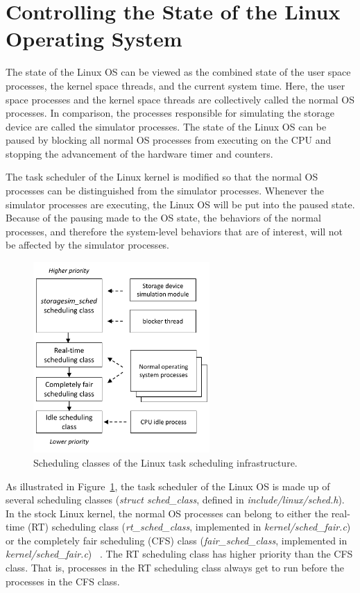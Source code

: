 \section{Controlling the State of the Linux Operating System}
\label{sec:managing-linux-OS-state}

The state of the Linux OS can be viewed as the combined state of the user space processes, the kernel space threads, and the current system time. Here, the user space processes and the kernel space threads are collectively called the normal OS processes. In comparison, the processes responsible for simulating the storage device are called the simulator processes. The state of the Linux OS can be paused by blocking all normal OS processes from executing on the CPU and stopping the advancement of the hardware timer and counters.

The task scheduler of the Linux kernel is modified so that the normal OS processes can be distinguished from the simulator processes. Whenever the simulator processes are executing, the Linux OS will be put into the paused state. Because of the pausing made to the OS state, the behaviors of the normal processes, and therefore the system-level behaviors that are of interest, will not be affected by the simulator processes.

\begin{figure}[htpb!]
	\centering
	\includegraphics[width=0.6\textwidth]{figures/ch5-scheduling-classes.pdf}
	\caption{\label{fig:ch5-scheduling-classes}Scheduling classes of the Linux task scheduling infrastructure.}
\end{figure}

As illustrated in Figure~\ref{fig:ch5-scheduling-classes}, the task scheduler of the Linux OS is made up of several scheduling classes (\textit{struct sched_class}, defined in \textit{include/linux/sched.h}). In the stock Linux kernel, the normal OS processes can belong to either the real-time (RT) scheduling class (\textit{rt_sched_class}, implemented in \textit{kernel/sched_fair.c}) or the completely fair scheduling (CFS) class (\textit{fair_sched_class}, implemented in \textit{kernel/sched_fair.c})~\cite{Bovet:2005} \cite{Love:2010}. The RT scheduling class has higher priority than the CFS class. That is, processes in the RT scheduling class always get to run before the processes in the CFS class.

